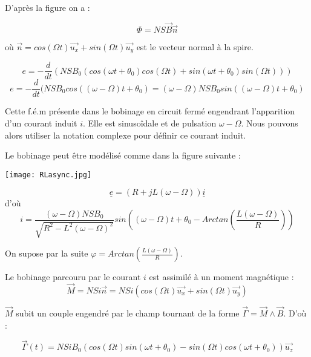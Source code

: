 \documentclass[12pt,prb,aps,epsf]{article}
\begin{document}
D'après la figure on a :

\begin{equation}
    \Phi = NS\vec{B} \vec{n}
\end{equation}

où $\vec{n} = cos(\Omega t) \vec{u_x} + sin(\Omega t)\vec{u_y}$ est le vecteur normal à la spire.

\begin{equation}
    e = - \frac{d}{dt} (NSB_0 (cos(\omega t + \theta_0)cos(\Omega t) + sin(\omega t +\theta_0) sin (\Omega t)))
\end{equation}
\begin{equation}
     e = - \frac{d}{dt} (NSB_0 cos((\omega -\Omega)t + \theta_0) = (\omega - \Omega)NSB_0 sin((\omega -\Omega)t + \theta_0)
\end{equation}

Cette f.é.m présente dans le bobinage en circuit fermé engendrant l'apparition d'un courant induit $i$. Elle est sinusoîdale et de pulsation $\omega -\Omega$. Nous pouvons alors utiliser la notation complexe pour définir ce courant induit. \medskip

Le bobinage peut être modélisé comme dans la figure suivante :

\begin{center}
    \texttt{[image: RLasync.jpg]}
\end{center}
 
\begin{equation}
    \underline{e} = (R + jL(\omega - \Omega)) \underline{i}
\end{equation}
d'où
\begin{equation}
    i = \frac{(\omega - \Omega)NSB_0}{\sqrt{R^2-L^2(\omega - \Omega)^2}} sin\left ( (\omega - \Omega)t + \theta_0 - Arctan \left ( \frac{L (\omega - \Omega)}{R} \right ) \right )
\end{equation}

On supose par la suite $\varphi = Arctan \left ( \frac{L (\omega - \Omega)}{R} \right )$.

Le bobinage parcouru par le courant $i$ est assimilé à un moment magnétique :
\begin{equation}
    \vec{M} = NSi\vec{n} = NSi(cos(\Omega t) \vec{u_x} + sin(\Omega t)\vec{u_y})
\end{equation}

$\vec{M}$ subit un couple engendré par le champ tournant de la forme $ \vec{\Gamma} = \vec{M} \land \vec{B} $. D'où :

\begin{equation}
    \vec{\Gamma}(t) = NSiB_0(cos(\Omega t) sin(\omega t + \theta_0) - sin(\Omega t)cos(\omega t + \theta_0))\vec{u_z}
\end{equation}
\end{document}
